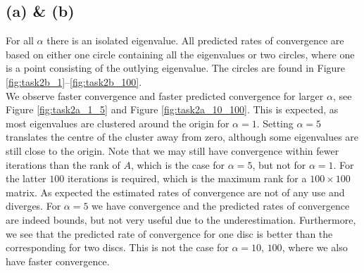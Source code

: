 \subsection*{(a) \& (b)}

For all $\alpha$ there is an isolated eigenvalue. All predicted rates of convergence are based on either one circle containing all the eigenvalues or two circles, where one is a point consisting of the outlying eigenvalue. The circles are found in Figure \ref{fig:task2b_1}--\ref{fig:task2b_100}. \\ We observe faster convergence and faster predicted convergence for larger $\alpha$, see Figure  \eqref{fig:task2a_1_5} and Figure \eqref{fig:task2a_10_100}. This is expected, as most eigenvalues are clustered around the origin for $\alpha = 1$. Setting $\alpha = 5$ translates the centre of the cluster away from zero, although some eigenvalues are still close to the origin. Note that we may still have convergence within fewer iterations than the rank of $A$, which is the case for $\alpha = 5$, but not for $\alpha = 1$. For the latter $100$ iterations is required, which is the maximum rank for a $100\times 100$ matrix. As expected the estimated rates of convergence are not of any use and diverges. For $\alpha = 5$ we have convergence and the predicted rates of convergence are indeed bounds, but not very useful due to the underestimation. Furthermore, we see that the predicted rate of convergence for one disc is better than the corresponding for two discs. This is not the case for
$\alpha = 10,\,100$, where we also have faster convergence.





